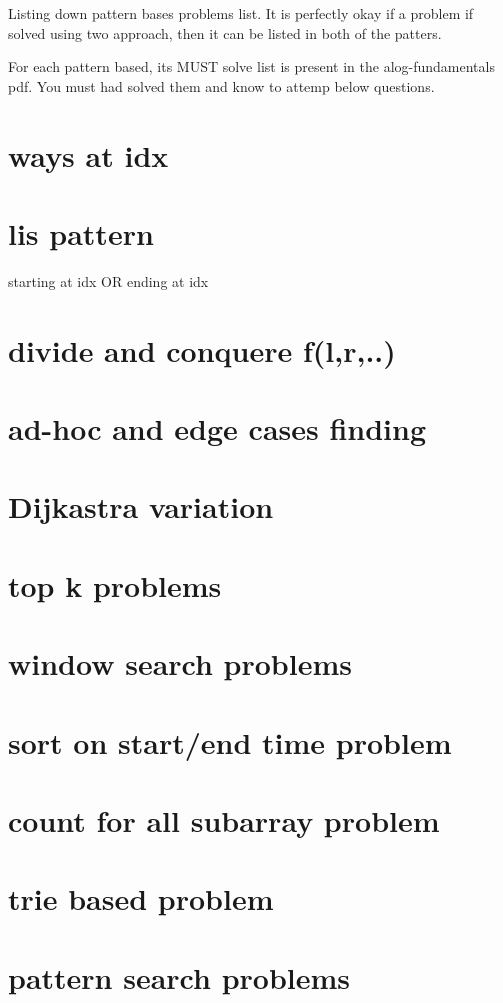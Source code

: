 
Listing down pattern bases problems list.
It is perfectly okay if a problem if solved using two approach, then it can be listed in both of the patters.

For each pattern based, its MUST solve list is present in the alog-fundamentals pdf. You must had solved them and know to attemp below questions.

\setcounter{chapter}{0}
\chapter{ways at idx}
\chapter{lis pattern}
    starting at idx OR ending at idx
\chapter{divide and conquere f(l,r,..)}
\chapter{ad-hoc and edge cases finding}
\chapter{Dijkastra variation}
\chapter{top k problems}
\chapter{window search problems}
\chapter{sort on start/end time problem}
\chapter{count for all subarray problem}
\chapter{trie based problem}
\chapter{pattern search problems}
